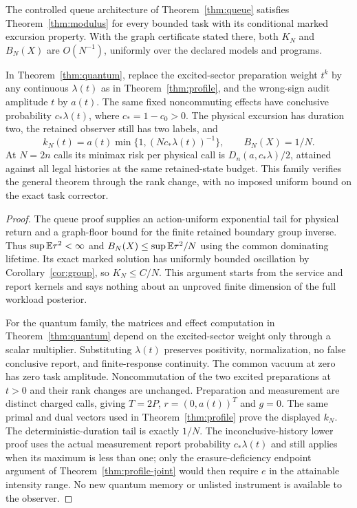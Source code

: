 \begin{corollary}\label{cor:raw-modulus}
The controlled queue architecture of Theorem~\ref{thm:queue} satisfies Theorem~\ref{thm:modulus} for every bounded task with its conditional marked excursion property. With the graph certificate stated there, both $K_N$ and $B_N(X)$ are $O(N^{-1})$, uniformly over the declared models and programs.

In Theorem~\ref{thm:quantum}, replace the excited-sector preparation weight $t^k$ by any continuous $\lambda(t)$ as in Theorem~\ref{thm:profile}, and the wrong-sign audit amplitude $t$ by $a(t)$. The same fixed noncommuting effects have conclusive probability $c_*\lambda(t)$, where $c_*=1-c_0>0$. The physical excursion has duration two, the retained observer still has two labels, and
\[
 k_N(t)=a(t)\min\{1,(Nc_*\lambda(t))^{-1}\},\qquad B_N(X)=1/N.
\]
At $N=2n$ calls its minimax risk per physical call is $D_n(a,c_*\lambda)/2$, attained against all legal histories at the same retained-state budget. This family verifies the general theorem through the rank change, with no imposed uniform bound on the exact task corrector.
\end{corollary}
\begin{proof}
The queue proof supplies an action-uniform exponential tail for physical return and a graph-floor bound for the finite retained boundary group inverse. Thus $\sup\mathbb E\tau^2<\infty$ and $B_N(X)\le\sup\mathbb E\tau^2/N$ using the common dominating lifetime. Its exact marked solution has uniformly bounded oscillation by Corollary~\ref{cor:group}, so $K_N\le C/N$. This argument starts from the service and report kernels and says nothing about an unproved finite dimension of the full workload posterior.

For the quantum family, the matrices and effect computation in Theorem~\ref{thm:quantum} depend on the excited-sector weight only through a scalar multiplier. Substituting $\lambda(t)$ preserves positivity, normalization, no false conclusive report, and finite-response continuity. The common vacuum at zero has zero task amplitude. Noncommutation of the two excited preparations at $t>0$ and their rank changes are unchanged. Preparation and measurement are distinct charged calls, giving $T=2P$, $r=(0,a(t))^T$ and $g=0$. The same primal and dual vectors used in Theorem~\ref{thm:profile} prove the displayed $k_N$. The deterministic-duration tail is exactly $1/N$. The inconclusive-history lower proof uses the actual measurement report probability $c_*\lambda(t)$ and still applies when its maximum is less than one; only the erasure-deficiency endpoint argument of Theorem~\ref{thm:profile-joint} would then require $e$ in the attainable intensity range. No new quantum memory or unlisted instrument is available to the observer.
\end{proof}

